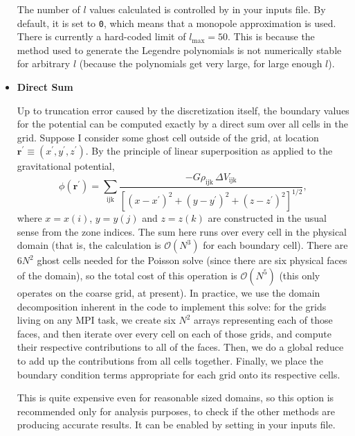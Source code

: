 \begin{itemize}
The number of $l$ values calculated is controlled by
 in your inputs file. By
default, it is set to \texttt{0}, which means that a monopole
approximation is used. There is currently a hard-coded limit of
$l_{\text{max}} = 50$. This is because the method used to generate the
Legendre polynomials is not numerically stable for arbitrary $l$
(because the polynomials get very large, for large enough $l$).

\item \textbf{Direct Sum}

Up to truncation error caused by the discretization itself, the
boundary values for the potential can be computed exactly by a direct
sum over all cells in the grid. Suppose I consider some ghost cell
outside of the grid, at location $\mathbf{r}^\prime \equiv (x^\prime,
y^\prime, z^\prime)$. By the principle of linear superposition as
applied to the gravitational potential,
\begin{equation}
  \phi(\mathbf{r}^\prime) = \sum_{\text{ijk}} \frac{-G \rho_{\text{ijk}}\, \Delta V_{\text{ijk}}}{\left[(x - x^\prime)^2 + (y - y^\prime)^2 + (z - z^\prime)^2\right]^{1/2}},
\end{equation}
where $x = x(i)$, $y = y(j)$ and $z = z(k)$ are constructed in the
usual sense from the zone indices. The sum here runs over every cell
in the physical domain (that is, the calculation is $\mathcal{O}(N^3)$
for each boundary cell). There are $6N^2$ ghost cells needed for the
Poisson solve (since there are six physical faces of the domain), so
the total cost of this operation is $\mathcal{O}(N^5)$ (this only
operates on the coarse grid, at present). In practice, we use the
domain decomposition inherent in the code to implement this solve: for
the grids living on any MPI task, we create six $N^2$ arrays
representing each of those faces, and then iterate over every cell on
each of those grids, and compute their respective contributions to all
of the faces. Then, we do a global reduce to add up the contributions
from all cells together. Finally, we place the boundary condition
terms appropriate for each grid onto its respective cells.

This is quite expensive even for reasonable sized domains, so this
option is recommended only for analysis purposes, to check if the
other methods are producing accurate results. It can be enabled by
setting  in your inputs file.

\end{itemize}


